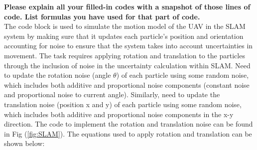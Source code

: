 \textbf{Please explain all your filled-in codes with a snapshot of those lines of code. List formulas you have used for that part of code.}\\
The code block is used to simulate the motion model of the UAV in the SLAM system by making sure that it updates each particle's position and orientation accounting for noise to ensure that the system takes into account uncertainties in movement. The task requires applying rotation and translation to the particles through the inclusion of noise in the uncertainty calculation within SLAM. Need to update the rotation noise (angle $\theta$) of each particle using some random noise, which includes both additive and proportional noise components (constant noise and proportional noise to current angle). Similarly, need to update the translation noise (position x and y) of each particle using some random noise, which includes both additive and proportional noise components in the x-y direction. The code to implement the rotation and translation noise can be found in Fig (\ref{fig:SLAM}). The equations used to apply rotation and translation can be shown below:
